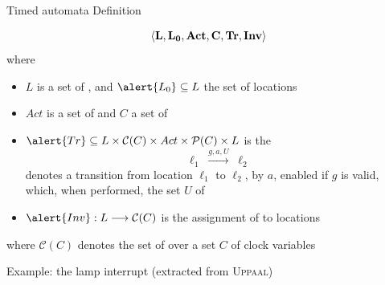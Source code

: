 \documentclass[aspectratio=169]{beamer}
\def\uppaal{\textsc{Uppaal}}
\def\cc#1{\mathcal{C}(#1)}
\def\pow#1{\ap{{\cal P}}{(#1)}}           \def\pow#1{{\cal P}#1} %
\def\tran#1{\stackrel{#1}{\longrightarrow}}
\newcommand{\fdec}[3]{#1: #2 \longrightarrow  #3}
\begin{document}
\begin{slide}{Timed automata Definition}
\small

\vspace*{-1mm}
\begin{block}{}
\begin{equation*}
\mathbf{\langle L, L_0, Act, C, Tr, Inv \rangle}
\end{equation*}
\vspace*{-1mm}
where
\vspace*{-1mm}
\begin{itemize}
\item \alert{$L$} is a set of , and $\alert{L_0} \subseteq L$ the set of  locations
\item \alert{$Act$} is a set of  and \alert{$C$} a set of 
\item $\alert{Tr} \subseteq L \times \cc{C} \times Act \times \pow{(C)} \times L$ is the 
\vspace*{-1mm}
\begin{equation*}
\ell_1\; \tran{g,a,U}\;  \ell_2
\end{equation*}
\vspace*{-1mm}
denotes a transition from location $\ell_1$ to $\ell_2$,  by $a$, enabled if  $g$
is valid, which, when performed,  the set $U$ of 
\item $\fdec{\alert{Inv}}{L}{\cc{C}}$ is the assignment of  to locations  
\end{itemize}
\vspace*{-1mm}
where \alert{$\cc{C}$} denotes the  set of  over a set $C$ of clock variables
\end{block}
\end{slide}

\begin{slide}{Example: the lamp interrupt}
\small
(extracted from \uppaal)

\begin{figure}[htb]
  \centering
\end{figure}

\vspace*{-3mm}

\end{slide}
\end{document}
